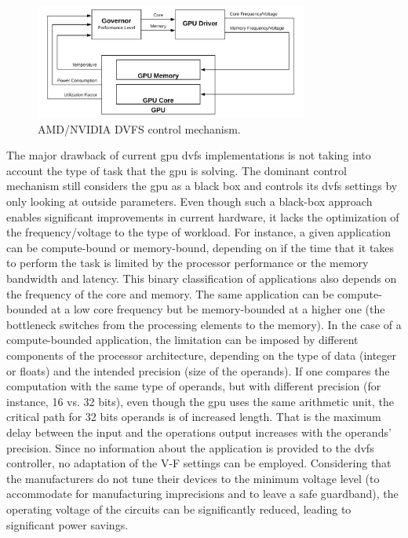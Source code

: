 \begin{figure}[htb]
  \centering
  \includegraphics[width=0.8\textwidth]{Figures/Background/DVFS.png}
  \caption{AMD/NVIDIA DVFS control mechanism.}
  \label{fig:DVFSmechanism}
\end{figure}

The major drawback of current \acrshort{gpu} \acrshort{dvfs} implementations is not taking into account the type of task that the \acrshort{gpu} is solving. The dominant control mechanism still considers the \acrshort{gpu} as a black box and controls its \acrshort{dvfs} settings by only looking at outside parameters. Even though such a black-box approach enables significant improvements in current hardware, it lacks the optimization of the frequency/voltage to the type of workload. For instance, a given application can be compute-bound or memory-bound, depending on if the time that it takes to perform the task is limited by the processor performance or the memory bandwidth and latency. This binary classification of applications also depends on the frequency of the core and memory. The same application can be compute-bounded at a low core frequency but be memory-bounded at a higher one \cite{guerreiro_dvfs-aware_2019} (the bottleneck switches from the processing elements to the memory). In the case of a compute-bounded application, the limitation can be imposed by different components of the processor architecture, depending on the type of data (integer or floats) and the intended precision (size of the operands). If one compares the computation with the same type of operands, but with different precision (for instance, 16 vs. 32 bits), even though the \acrshort{gpu} uses the same arithmetic unit, the critical path for 32 bits operands is of increased length. That is the maximum delay between the input and the operations output increases with the operands' precision. 
Since no information about the application is provided to the \acrshort{dvfs} controller, no adaptation of the V-F settings can be employed.
Considering that the manufacturers do not tune their devices to the minimum voltage level (to accommodate for manufacturing imprecisions and to leave a safe guardband), the operating voltage of the circuits can be significantly reduced, leading to significant power savings. 

